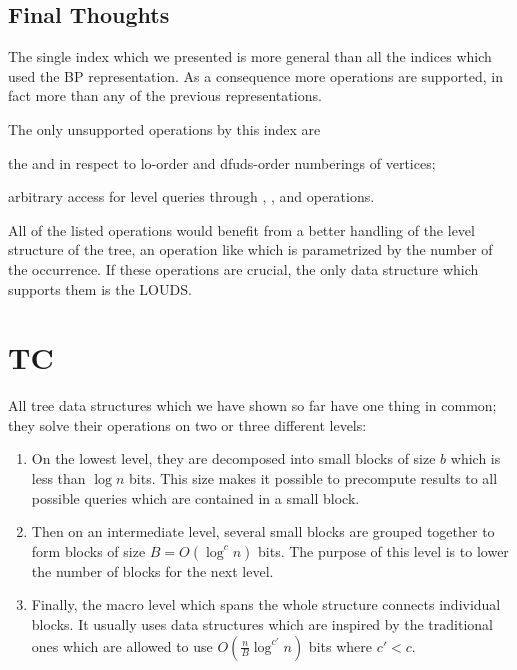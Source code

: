 \subsection{Final Thoughts}

The single index which we presented is more general than all the indices which used the BP representation.
As a consequence more operations are supported, in fact more than any of the previous representations.

The only unsupported operations by this index are
\begin{enuminline}
	\item the \rank{} and \select{} in respect to lo-order and dfuds-order numberings of vertices;
	\item arbitrary access for level queries through \levelSize{}, \levelRank{}, and \levelSelect{} operations.
\end{enuminline}

All of the listed operations would benefit from a better handling of the level structure of the tree, an operation like \fwdSearch{} which is parametrized by the number of the occurrence.
If these operations are crucial, the only data structure which supports them is the LOUDS.


\section{TC}

All tree data structures which we have shown so far have one thing in common; they solve their operations on two or three different levels:
\begin{enumerate}
	\item On the lowest level, they are decomposed into small blocks of size $b$ which is less than $\log n$ bits.
	This size makes it possible to precompute results to all possible queries which are contained in a small block.
	
	\item Then on an intermediate level, several small blocks are grouped together to form blocks of size $B = O(\log^c n)$ bits.
	The purpose of this level is to lower the number of blocks for the next level.
	
	\item Finally, the macro level which spans the whole structure connects individual blocks.
	It usually uses data structures which are inspired by the traditional ones which are allowed to use $O(\frac{n}{B} \log^{c'} n)$ bits where $c' < c$.
\end{enumerate}

